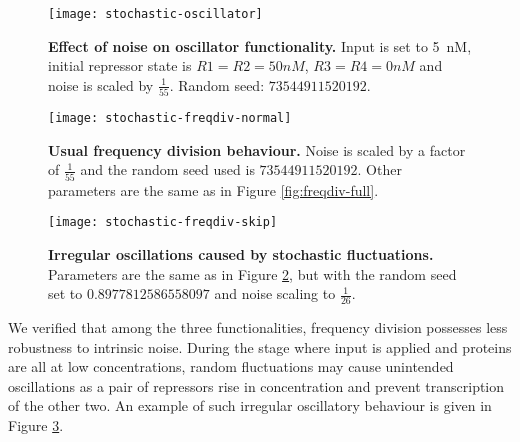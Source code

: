     \begin{figure}[!htb]
      \centering
      \texttt{[image: stochastic-oscillator]}
      \caption{\textbf{Effect of noise on oscillator functionality.} Input is set to \SI{5}{\nano M}, initial repressor state is $R1 = R2 = 50nM$, $R3 = R4 = 0nM$ and noise is scaled by $\frac{1}{55}$. Random seed: $73544911520192$.}
      \label{fig:stochastic-oscillator}
    \end{figure}

    \begin{figure}[!htb]
      \centering
      \texttt{[image: stochastic-freqdiv-normal]}
      \caption{\textbf{Usual frequency division behaviour.} Noise is scaled by a factor of $\frac{1}{55}$ and the random seed used is $73544911520192$. Other parameters are the same as in Figure \ref{fig:freqdiv-full}.}
      \label{fig:stochastic-freqdiv-normal}
    \end{figure}
    \begin{figure}[!htb]
      \centering
      \texttt{[image: stochastic-freqdiv-skip]}
      \caption{\textbf{Irregular oscillations caused by stochastic fluctuations.} Parameters are the same as in Figure \ref{fig:stochastic-freqdiv-normal}, but with the random seed set to $0.8977812586558097$ and noise scaling to $\frac{1}{26}$.}
      \label{fig:stochastic-freqdiv-skip}
    \end{figure}

    We verified that among the three functionalities, frequency division possesses less robustness to intrinsic noise.
    During the stage where input is applied and proteins are all at low concentrations, random fluctuations may cause unintended oscillations as a pair of repressors rise in concentration and prevent transcription of the other two.
    An example of such irregular oscillatory behaviour is given in Figure \ref{fig:stochastic-freqdiv-skip}.





